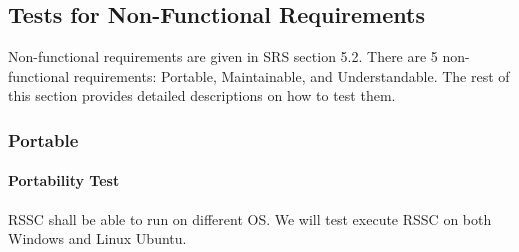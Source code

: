 \documentclass[12pt, titlepage]{article}
\begin{document}
\subsection{Tests for Non-Functional Requirements}
\label{tnfr}

Non-functional requirements are given in SRS section 5.2. There are 5 non-
functional requirements: Portable, Maintainable, and Understandable. The 
rest of this section provides detailed descriptions on how to test them.

\subsubsection{Portable}\label{Aport}

\paragraph{Portability Test} RSSC shall be able to run on different OS. 
We will test execute RSSC on both Windows and Linux Ubuntu.
\end{document}
